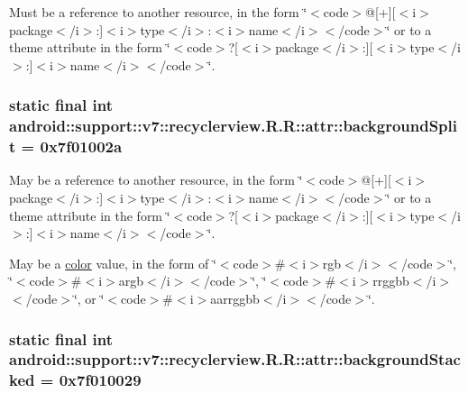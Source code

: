 Must be a reference to another resource, in the form \char`\"{}$<$code$>$@\mbox{[}+\mbox{]}\mbox{[}$<$i$>$package$<$/i$>$:\mbox{]}$<$i$>$type$<$/i$>$:$<$i$>$name$<$/i$>$$<$/code$>$\char`\"{} or to a theme attribute in the form \char`\"{}$<$code$>$?\mbox{[}$<$i$>$package$<$/i$>$:\mbox{]}\mbox{[}$<$i$>$type$<$/i$>$:\mbox{]}$<$i$>$name$<$/i$>$$<$/code$>$\char`\"{}. \hypertarget{classandroid_1_1support_1_1v7_1_1recyclerview_1_1_r_1_1attr_5c777d0636c83325d93750b04fd61259}{
\subsubsection[{backgroundSplit}]{\setlength{\rightskip}{0pt plus 5cm}static final int android::support::v7::recyclerview.R.R::attr::backgroundSplit = 0x7f01002a}}
\label{classandroid_1_1support_1_1v7_1_1recyclerview_1_1_r_1_1attr_5c777d0636c83325d93750b04fd61259}


May be a reference to another resource, in the form \char`\"{}$<$code$>$@\mbox{[}+\mbox{]}\mbox{[}$<$i$>$package$<$/i$>$:\mbox{]}$<$i$>$type$<$/i$>$:$<$i$>$name$<$/i$>$$<$/code$>$\char`\"{} or to a theme attribute in the form \char`\"{}$<$code$>$?\mbox{[}$<$i$>$package$<$/i$>$:\mbox{]}\mbox{[}$<$i$>$type$<$/i$>$:\mbox{]}$<$i$>$name$<$/i$>$$<$/code$>$\char`\"{}. 

May be a \hyperlink{classandroid_1_1support_1_1v7_1_1recyclerview_1_1_r_1_1color}{color} value, in the form of \char`\"{}$<$code$>$\#$<$i$>$rgb$<$/i$>$$<$/code$>$\char`\"{}, \char`\"{}$<$code$>$\#$<$i$>$argb$<$/i$>$$<$/code$>$\char`\"{}, \char`\"{}$<$code$>$\#$<$i$>$rrggbb$<$/i$>$$<$/code$>$\char`\"{}, or \char`\"{}$<$code$>$\#$<$i$>$aarrggbb$<$/i$>$$<$/code$>$\char`\"{}. \hypertarget{classandroid_1_1support_1_1v7_1_1recyclerview_1_1_r_1_1attr_769011c016bcca487e8e0a3e6f19c134}{
\subsubsection[{backgroundStacked}]{\setlength{\rightskip}{0pt plus 5cm}static final int android::support::v7::recyclerview.R.R::attr::backgroundStacked = 0x7f010029}}
\label{classandroid_1_1support_1_1v7_1_1recyclerview_1_1_r_1_1attr_769011c016bcca487e8e0a3e6f19c134}



